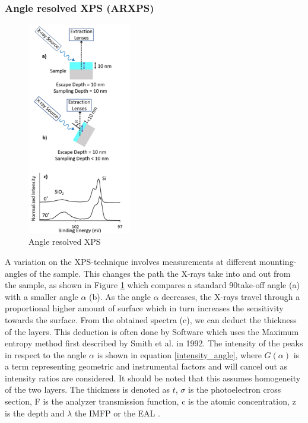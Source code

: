 \subsubsection{Angle resolved XPS (ARXPS)}
\begin{figure}
    \centering
    \includegraphics[width=0.4\textwidth]{Figures/ARXPS.png}
    \caption{Angle resolved XPS \cite{stevie_introduction_2020}}
    \label{fig:arxps}
\end{figure}
A variation on the XPS-technique involves measurements at different mounting-angles of the sample.
This changes the path the X-rays take into and out from the sample, as shown in Figure \ref{fig:arxps} which compares a standard 90\textdegree  take-off angle (a) with a smaller angle $\alpha$ (b). As the angle $\alpha$ decreases, the X-rays travel through a proportional higher amount of surface which in turn increases the sensitivity towards the surface. From the obtained spectra (c), we can deduct the thickness of the layers. This deduction is often done by Software which uses the Maximum entropy method first described by Smith et al. \cite{smith_maximum_1992} in 1992.
The intensity of the peaks in respect to the angle $\alpha$ is shown in equation \ref{intensity_angle}, where $G(\alpha)$ is a term representing geometric and instrumental factors and will cancel out as intensity ratios are considered. It should be noted that this assumes homogeneity of the two layers.
The thickness is denoted as $t$,
$\sigma$ is the photoelectron cross section,
F is the analyzer transmission function,
c is the atomic concentration,
z is the depth and $\lambda$ the IMFP or the EAL
\cite{paynter_arxps_2009}.

